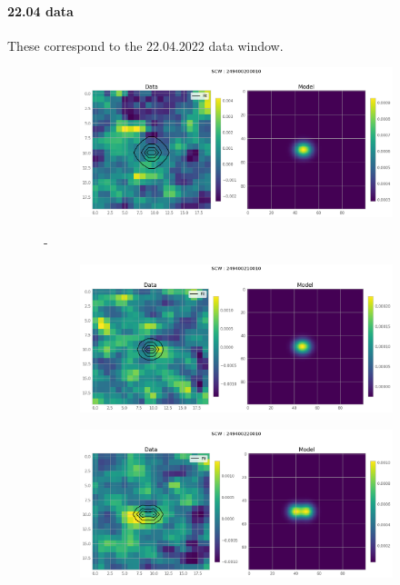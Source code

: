 \documentclass[
	a4paper, %
	10pt, %
	unnumberedsections, %
	twoside, %
]{LTJournalArticle}
\begin{document}
\paragraph{22.04 data}
These correspond to the 22.04.2022 data window.
    \begin{figure}[H]
    \centering
    \begin{subfigure}{.47\textwidth}
        \includegraphics[width=\textwidth]{report/Figures/models/2204/20_psf_const.png}
    \end{subfigure}%
    \hspace{1em}-
    \begin{subfigure}{.47\textwidth}
        \centering
        \includegraphics[width=\textwidth]{report/Figures/models/2204/21_psf_const.png}
    \end{subfigure}
    \begin{subfigure}{.47\textwidth}
        \centering
        \includegraphics[width=\textwidth]{report/Figures/models/2204/22_psf_const.png}

\end{subfigure}
\end{figure}
\end{document}
